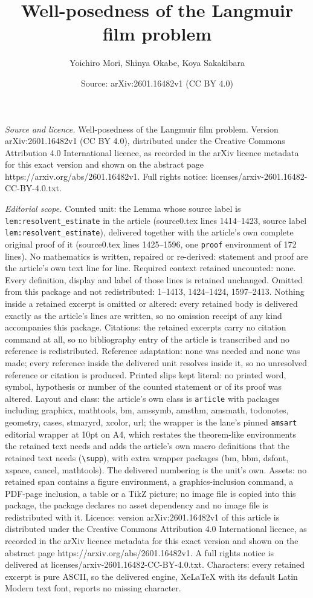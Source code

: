 \documentclass[10pt,a4paper]{amsart}
\title[Well-posedness of the Langmuir film problem]{Well-posedness of the Langmuir film problem}
\author{Yoichiro Mori, Shinya Okabe, Koya Sakakibara}
\date{Source: arXiv:2601.16482v1 (CC BY 4.0)}
\begin{document}
\maketitle

\noindent\emph{Source and licence.} Well-posedness of the Langmuir film problem. Version arXiv:2601.16482v1 (CC BY 4.0), distributed under the Creative Commons Attribution 4.0 International licence, as recorded in the arXiv licence metadata for this exact version and shown on the abstract page https://arxiv.org/abs/2601.16482v1. Full rights notice: licenses/arxiv-2601.16482-CC-BY-4.0.txt.\par\smallskip

\noindent\textit{Editorial scope.} Counted unit: the Lemma whose source label is \texttt{lem:resolvent\_estimate} in the article (source0.tex lines 1414--1423, source label \texttt{lem:resolvent\_estimate}), delivered together with the article's own complete original proof of it (source0.tex lines 1425--1596, one \texttt{proof} environment of 172 lines). No mathematics is written, repaired or re-derived: statement and proof are the article's own text line for line. Required context retained uncounted: none. Every definition, display and label of those lines is retained unchanged. Omitted from this package and not redistributed: 1--1413, 1424--1424, 1597--2413. Nothing inside a retained excerpt is omitted or altered: every retained body is delivered exactly as the article's lines are written, so no omission receipt of any kind accompanies this package. Citations: the retained excerpts carry no citation command at all, so no bibliography entry of the article is transcribed and no reference is redistributed. Reference adaptation: none was needed and none was made; every reference inside the delivered unit resolves inside it, so no unresolved reference or citation is produced. Printed slips kept literal: no printed word, symbol, hypothesis or number of the counted statement or of its proof was altered. Layout and class: the article's own class is \texttt{article} with packages including graphicx, mathtools, bm, amssymb, amsthm, amsmath, todonotes, geometry, cases, stmaryrd, xcolor, url; the wrapper is the lane's pinned \texttt{amsart} editorial wrapper at 10pt on A4, which restates the theorem-like environments the retained text needs and adds the article's own macro definitions that the retained text needs (\texttt{\textbackslash supp}), with extra wrapper packages (bm, bbm, dsfont, xspace, cancel, mathtools). The delivered numbering is the unit's own. Assets: no retained span contains a figure environment, a graphics-inclusion command, a PDF-page inclusion, a table or a TikZ picture; no image file is copied into this package, the package declares no asset dependency and no image file is redistributed with it. Licence: version arXiv:2601.16482v1 of this article is distributed under the Creative Commons Attribution 4.0 International licence, as recorded in the arXiv licence metadata for this exact version and shown on the abstract page https://arxiv.org/abs/2601.16482v1. A full rights notice is delivered at licenses/arxiv-2601.16482-CC-BY-4.0.txt. Characters: every retained excerpt is pure ASCII, so the delivered engine, XeLaTeX with its default Latin Modern text font, reports no missing character.
\end{document}
